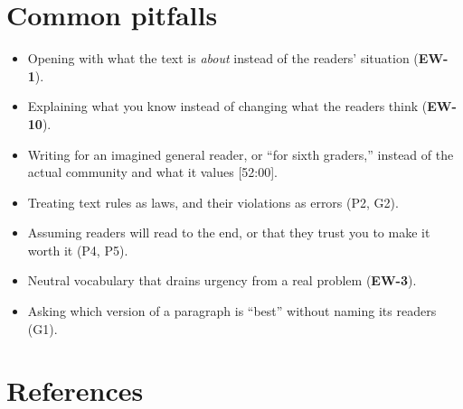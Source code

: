 \documentclass[11pt]{article}
\newcommand{\ts}[1]{{\sffamily\footnotesize\color{muted}[#1]}}        %
\newcommand{\id}[1]{{\sffamily\bfseries\color{accent}#1}}              %
\begin{document}
\section{Common pitfalls}

\begin{itemize}[leftmargin=1.4em]
  \item Opening with what the text is \emph{about} instead of the readers' situation (\id{EW-1}).
  \item Explaining what you know instead of changing what the readers think (\id{EW-10}).
  \item Writing for an imagined general reader, or ``for sixth graders,'' instead of the actual community and
        what it values \ts{52:00}.
  \item Treating text rules as laws, and their violations as errors (P2, G2).
  \item Assuming readers will read to the end, or that they trust you to make it worth it (P4, P5).
  \item Neutral vocabulary that drains urgency from a real problem (\id{EW-3}).
  \item Asking which version of a paragraph is ``best'' without naming its readers (G1).
\end{itemize}

\section{References}
\enlargethispage{2\baselineskip}%
\end{document}
